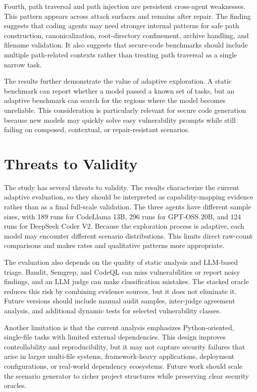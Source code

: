 \documentclass[11pt]{article}
\begin{document}
Fourth, path traversal and path injection are persistent cross-agent weaknesses. This pattern appears across attack surfaces and remains after repair. The finding suggests that coding agents may need stronger internal patterns for safe path construction, canonicalization, root-directory confinement, archive handling, and filename validation. It also suggests that secure-code benchmarks should include multiple path-related contexts rather than treating path traversal as a single narrow task.

The results further demonstrate the value of adaptive exploration. A static benchmark can report whether a model passed a known set of tasks, but an adaptive benchmark can search for the regions where the model becomes unreliable. This consideration is particularly relevant for secure code generation because new models may quickly solve easy vulnerability prompts while still failing on composed, contextual, or repair-resistant scenarios.

\FloatBarrier
\section{Threats to Validity}

The study has several threats to validity. The results characterize the current adaptive evaluation, so they should be interpreted as capability-mapping evidence rather than as a final full-scale validation. The three agents have different sample sizes, with 189 runs for CodeLlama 13B, 296 runs for GPT-OSS 20B, and 124 runs for DeepSeek Coder V2. Because the exploration process is adaptive, each model may encounter different scenario distributions. This limits direct raw-count comparisons and makes rates and qualitative patterns more appropriate.

The evaluation also depends on the quality of static analysis and LLM-based triage. Bandit, Semgrep, and CodeQL can miss vulnerabilities or report noisy findings, and an LLM judge can make classification mistakes. The stacked oracle reduces this risk by combining evidence sources, but it does not eliminate it. Future versions should include manual audit samples, inter-judge agreement analysis, and additional dynamic tests for selected vulnerability classes.

Another limitation is that the current analysis emphasizes Python-oriented, single-file tasks with limited external dependencies. This design improves controllability and reproducibility, but it may not capture security failures that arise in larger multi-file systems, framework-heavy applications, deployment configurations, or real-world dependency ecosystems. Future work should scale the scenario generator to richer project structures while preserving clear security oracles.
\end{document}
